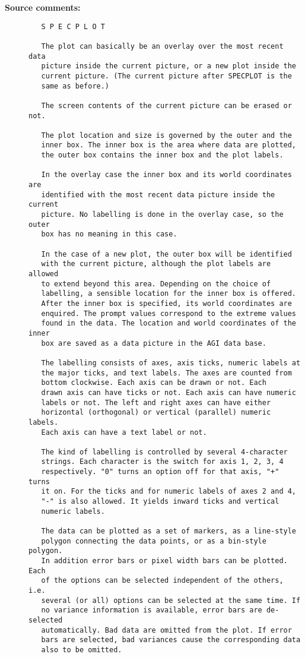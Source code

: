 \begin{description}
\begin{description}
\end{description}

\item [{\bf Source comments:}]
\begin{verbatim}
   S P E C P L O T

   The plot can basically be an overlay over the most recent data
   picture inside the current picture, or a new plot inside the
   current picture. (The current picture after SPECPLOT is the
   same as before.)

   The screen contents of the current picture can be erased or not.

   The plot location and size is governed by the outer and the
   inner box. The inner box is the area where data are plotted,
   the outer box contains the inner box and the plot labels.

   In the overlay case the inner box and its world coordinates are
   identified with the most recent data picture inside the current
   picture. No labelling is done in the overlay case, so the outer
   box has no meaning in this case.

   In the case of a new plot, the outer box will be identified
   with the current picture, although the plot labels are allowed
   to extend beyond this area. Depending on the choice of
   labelling, a sensible location for the inner box is offered.
   After the inner box is specified, its world coordinates are
   enquired. The prompt values correspond to the extreme values
   found in the data. The location and world coordinates of the inner
   box are saved as a data picture in the AGI data base.

   The labelling consists of axes, axis ticks, numeric labels at
   the major ticks, and text labels. The axes are counted from
   bottom clockwise. Each axis can be drawn or not. Each
   drawn axis can have ticks or not. Each axis can have numeric
   labels or not. The left and right axes can have either
   horizontal (orthogonal) or vertical (parallel) numeric labels.
   Each axis can have a text label or not.

   The kind of labelling is controlled by several 4-character
   strings. Each character is the switch for axis 1, 2, 3, 4
   respectively. "0" turns an option off for that axis, "+" turns
   it on. For the ticks and for numeric labels of axes 2 and 4,
   "-" is also allowed. It yields inward ticks and vertical
   numeric labels.

   The data can be plotted as a set of markers, as a line-style
   polygon connecting the data points, or as a bin-style polygon.
   In addition error bars or pixel width bars can be plotted. Each
   of the options can be selected independent of the others, i.e.
   several (or all) options can be selected at the same time. If
   no variance information is available, error bars are de-selected
   automatically. Bad data are omitted from the plot. If error
   bars are selected, bad variances cause the corresponding data
   also to be omitted.


\end{verbatim}
\end{description}
